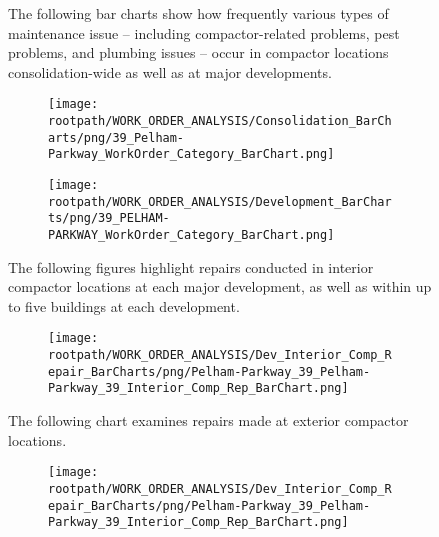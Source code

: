 \begin{figure}[h]
                                \sf
                                The following bar charts show how frequently various types of maintenance issue -- including compactor-related problems, pest problems, and plumbing issues -- occur in compactor locations consolidation-wide as well as at major developments.
                                \raggedright
                                \begin{subfigure}{\textwidth}
                                \texttt{[image: \\rootpath/WORK\_ORDER\_ANALYSIS/Consolidation\_BarCharts/png/39\_Pelham-Parkway\_WorkOrder\_Category\_BarChart.png]}
                                \end{subfigure}
                                \begin{subfigure}{\textwidth}
                                    \texttt{[image: \\rootpath/WORK\_ORDER\_ANALYSIS/Development\_BarCharts/png/39\_PELHAM-PARKWAY\_WorkOrder\_Category\_BarChart.png]}
                                    \end{subfigure}
                                    \end{figure}\begin{figure}[h]
                                \raggedright
                                \sf
                                The following figures highlight repairs conducted in interior compactor locations at each major development, as well as within up to five buildings at each development.\\
                                \begin{subfigure}{\textwidth}
                                    \texttt{[image: \\rootpath/WORK\_ORDER\_ANALYSIS/Dev\_Interior\_Comp\_Repair\_BarCharts/png/Pelham-Parkway\_39\_Pelham-Parkway\_39\_Interior\_Comp\_Rep\_BarChart.png]}
                                    \end{subfigure}
                                    
                                    \end{figure}\begin{figure}[h]
                                \sf
                                \raggedright
                                The following chart examines repairs made at exterior compactor locations.
                                \sf
                                \begin{subfigure}{\textwidth}
                                    \texttt{[image: \\rootpath/WORK\_ORDER\_ANALYSIS/Dev\_Interior\_Comp\_Repair\_BarCharts/png/Pelham-Parkway\_39\_Pelham-Parkway\_39\_Interior\_Comp\_Rep\_BarChart.png]}
                                    \end{subfigure}
                                    \end{figure}